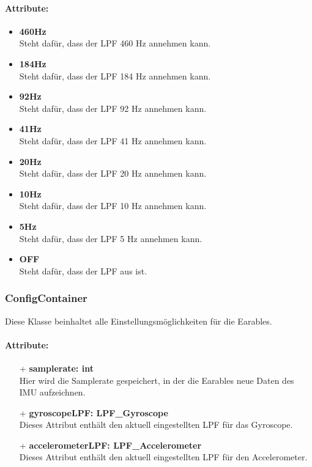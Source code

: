 \documentclass[a4paper,12pt]{article}
\begin{document}
\paragraph{Attribute:}
\begin{itemize}
	\item \textbf{460Hz}\\Steht dafür, dass der LPF 460 Hz annehmen kann.
	\item \textbf{184Hz}\\Steht dafür, dass der LPF 184 Hz annehmen kann.
	\item \textbf{92Hz}\\Steht dafür, dass der LPF 92 Hz annehmen kann.
	\item \textbf{41Hz}\\Steht dafür, dass der LPF 41 Hz annehmen kann.
	\item \textbf{20Hz}\\Steht dafür, dass der LPF 20 Hz annehmen kann.
	\item \textbf{10Hz}\\Steht dafür, dass der LPF 10 Hz annehmen kann.
	\item \textbf{5Hz}\\Steht dafür, dass der LPF 5 Hz annehmen kann.
	\item \textbf{OFF}\\Steht dafür, dass der LPF aus ist.
\end{itemize}


\subsubsection{ConfigContainer}
Diese Klasse beinhaltet alle Einstellungsmöglichkeiten für die Earables.

\paragraph{Attribute:}
\begin{itemize}
	\item[+] \textbf{samplerate: int}\\Hier wird die Samplerate gespeichert, in der die Earables neue Daten des IMU aufzeichnen.
	\item[+] \textbf{gyroscopeLPF: LPF\_Gyroscope}\\Dieses Attribut enthält den aktuell eingestellten LPF für das Gyroscope.
	\item[+] \textbf{accelerometerLPF: LPF\_Accelerometer}\\Dieses Attribut enthält den aktuell eingestellten LPF für den Accelerometer.
\end{itemize}
\end{document}
